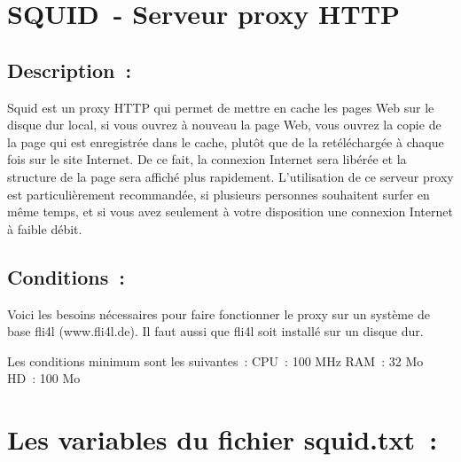 
\section {SQUID~- Serveur proxy HTTP}

\subsection{Description~:}

Squid est un proxy HTTP qui permet de mettre en cache les pages Web sur le
disque dur local, si vous ouvrez à nouveau la page Web, vous ouvrez la copie de
la page qui est enregistrée dans le cache, plutôt que de la retéléchargée à
chaque fois sur le site Internet. De ce fait, la connexion Internet sera
libérée et la structure de la page sera affiché plus rapidement. L'utilisation
de ce serveur proxy est particulièrement recommandée, si plusieurs personnes
souhaitent surfer en même temps, et si vous avez seulement à votre disposition
une connexion Internet à faible débit.

\subsection{Conditions~:}

Voici les besoins nécessaires pour faire fonctionner le proxy sur un système de
base fli4l (www.fli4l.de). Il faut aussi que fli4l soit installé sur un disque dur.

Les conditions minimum sont les suivantes~:
CPU~: 100 MHz
RAM~:  32 Mo
HD~:  100 Mo




\section{Les variables du fichier squid.txt~:}

